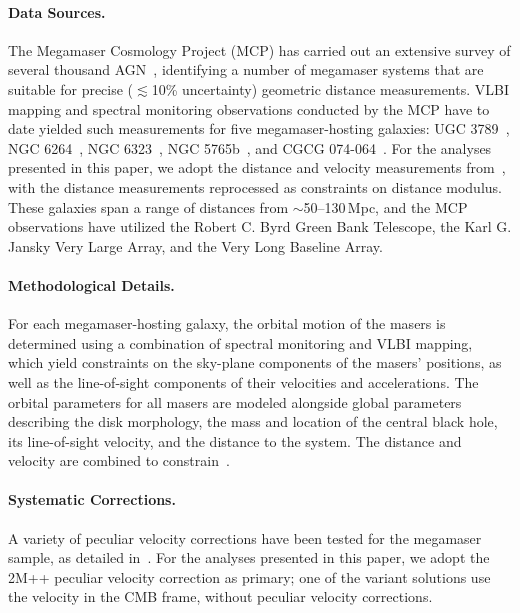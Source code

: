 \paragraph{Data Sources.}
The Megamaser Cosmology Project (MCP) has carried out an extensive survey of several thousand AGN~\citep{2015IAUGA..2255730B,2020ApJ...892...18K}, identifying a number of megamaser systems that are suitable for precise ($\lesssim$10\% uncertainty) geometric distance measurements.  VLBI mapping and spectral monitoring observations conducted by the MCP have to date yielded such measurements for five megamaser-hosting galaxies: UGC 3789~\citep{2009ApJ...695..287R,2010ApJ...718..657B,2013ApJ...767..154R}, NGC 6264~\citep{2013ApJ...767..155K}, NGC 6323~\citep{2015ApJ...800...26K}, NGC 5765b~\citep{2016ApJ...817..128G}, and CGCG 074-064~\citep{2020ApJ...890..118P}.  For the analyses presented in this paper, we adopt the distance and velocity measurements from~\citet{2020ApJ...891L...1P}, with the distance measurements reprocessed as constraints on distance modulus.  These galaxies span a range of distances from $\sim$50--130\,Mpc, and the MCP observations have utilized the Robert C. Byrd Green Bank Telescope, the Karl G. Jansky Very Large Array, and the Very Long Baseline Array.

\paragraph{Methodological Details.}
For each megamaser-hosting galaxy, the orbital motion of the masers is determined using a combination of spectral monitoring and VLBI mapping, which yield constraints on the sky-plane components of the masers' positions, as well as the line-of-sight components of their velocities and accelerations.  The orbital parameters for all masers are modeled alongside global parameters describing the disk morphology, the mass and location of the central black hole, its line-of-sight velocity, and the distance to the system.  The distance and velocity are combined to constrain {\Hcst}\,.

\paragraph{Systematic Corrections.}
A variety of peculiar velocity corrections have been tested for the megamaser sample, as detailed in~\citet{2020ApJ...891L...1P}. For the analyses presented in this paper, we adopt the 2M++ peculiar velocity correction as primary; one of the variant solutions use the velocity in the CMB frame, without peculiar velocity corrections. 

